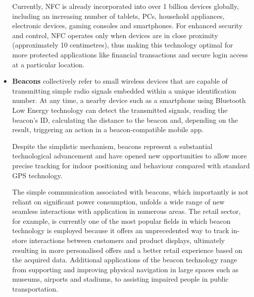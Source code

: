 \begin{itemize}
  Currently, NFC is already incorporated into over 1 billion devices globally, including an increasing number of tablets, PCs, household appliances, electronic devices, gaming consoles and smartphones. For enhanced security and control, NFC operates only when devices are in close proximity (approximately 10 centimetres), thus making this technology optimal for more protected applications like financial transactions and secure login access at a particular location. 
 
  \item \textbf{Beacons} \label{beacons} collectively refer to small wireless devices that are capable of transmitting simple radio signals embedded within a unique identification number. At any time, a nearby device such as a smartphone using Bluetooth Low Energy technology can detect the transmitted signals, reading the beacon’s ID, calculating the distance to the beacon and, depending on the result, triggering an action in a beacon-compatible mobile app. 
  
  Despite the simplistic mechanism, beacons represent a substantial technological advancement and have opened new opportunities to allow more precise tracking for indoor positioning and behaviour compared with standard GPS technology.
  
  The simple communication associated with beacons, which importantly is not reliant on significant power consumption, unfolds a wide range of new seamless interactions with application in numerous areas. The retail sector, for example, is currently one of the most popular fields in which beacon technology is employed because it offers an unprecedented way to track in-store interactions between customers and product displays, ultimately resulting in more personalised offers and a better retail experience based on the acquired data. Additional applications of the beacon technology range from supporting and improving physical navigation in large spaces such as museums, airports and stadiums, to assisting impaired people in public transportation.


\end{itemize}
